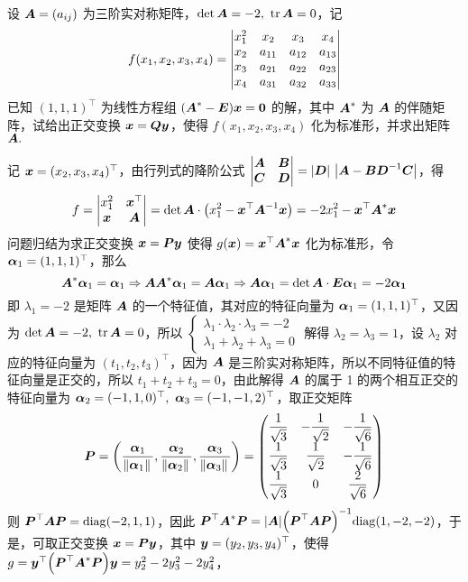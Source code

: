 \begin{example}
    设 $\vb*{A}=(a_{ij})$ 为三阶实对称矩阵，$\det\vb*{A}=-2,~\tr\vb*{A}=0$，记 $$f(x_1,x_2,x_3,x_4)=\mqty|x_1^2&x_2&x_3&x_4\\x_2&a_{11}&a_{12}&a_{13}\\x_3&a_{21}&a_{22}&a_{23}\\x_4&a_{31}&a_{32}&a_{33}|$$
    已知 $(1,1,1)^\top$ 为线性方程组 $\qty(\vb*{A}^*-\vb*{E})\vb*{x}=\vb*{0}$ 的解，其中 $\vb*{A}^*$ 为 $\vb*{A}$ 的伴随矩阵，试给出正交变换 $\vb*{x}=\vb*{Qy}$，使得 $f(x_1,x_2,x_3,x_4)$ 化为标准形，并求出矩阵 $\vb*{A}.$
\end{example}
\begin{solution}
    记 $\vb*{x}=(x_2,x_3,x_4)^\top$，由行列式的降阶公式 $\mqty|\vb*{A}&\vb*{B}\\\vb*{C}&\vb*{D}|=|\vb*{D}|~\qty|\vb*{A}-\vb*{BD}^{-1}\vb*{C}|$，得
    $$f=\mqty|x_1^2&\vb*{x}^\top\\\vb*{x}&\vb*{A}|=\det\vb*{A}\cdot\qty(x_1^2-\vb*{x}^\top\vb*{A}^{-1}\vb*{x})=-2x_1^2-\vb*{x}^\top\vb*{A}^*\vb*{x}$$
    问题归结为求正交变换 $\vb*{x}=\vb*{Py}$ 使得 $g(\vb*{x})=\vb*{x}^\top\vb*{A}^*\vb*{x}$ 化为标准形，令 $\vb*{\alpha}_1=(1,1,1)^\top$，那么
    $$\vb*{A}^*\vb*{\alpha}_1=\vb*{\alpha}_1\Rightarrow \vb*{AA}^*\vb*{\alpha}_1=\vb*{A\alpha}_1\Rightarrow \vb*{A\alpha}_1=\det\vb*{A}\cdot\vb*{E\alpha}_1=-2\vb*{\alpha_1}$$
    即 $\lambda_1=-2$ 是矩阵 $\vb*{A}$ 的一个特征值，其对应的特征向量为 $\vb*{\alpha}_1=(1,1,1)^\top$，又因为 $\det\vb*{A}=-2,~\tr\vb*{A}=0$，所以 $\begin{cases}
            \lambda_1\cdot\lambda_2\cdot\lambda_3=-2 \\
            \lambda_1+\lambda_2+\lambda_3=0
        \end{cases}$ 解得 $\lambda_2=\lambda_3=1$，设 $\lambda_2$ 对应的特征向量为 $(t_1,t_2,t_3)^\top$，因为 $\vb*{A}$ 是三阶实对称矩阵，所以不同特征值的特征向量是正交的，所以 $t_1+t_2+t_3=0$，由此解得 $\vb*{A}$ 的属于 1 的两个相互正交的特征向量为 $\vb*{\alpha}_2=(-1,1,0)^\top,~\vb*{\alpha}_3=(-1,-1,2)^\top$，取正交矩阵
    $$\vb*{P}=\qty(\dfrac{\vb*{\alpha}_1}{\norm*{\vb*{\alpha}_1}},\dfrac{\vb*{\alpha}_2}{\norm*{\vb*{\alpha}_2}},\dfrac{\vb*{\alpha}_3}{\norm*{\vb*{\alpha}_3}})=\mqty(\dfrac{1}{\sqrt{3}}&-\dfrac{1}{\sqrt{2}}&-\dfrac{1}{\sqrt{6}}\\[6pt]\dfrac{1}{\sqrt{3}}&\dfrac{1}{\sqrt{2}}&-\dfrac{1}{\sqrt{6}}\\[6pt]\dfrac{1}{\sqrt{3}}&0&\dfrac{2}{\sqrt{6}})$$
    则 $\vb*{P}^\top\vb*{AP}=\mathrm{diag}(-2,1,1)$，因此 $\vb*{P}^\top\vb*{A}^*\vb*{P}=|\vb*{A}|\qty(\vb*{P}^\top\vb*{AP})^{-1}\mathrm{diag}(1,-2,-2)$，于是，可取正交变换 $\vb*{x}=\vb*{Py}$，其中 $\vb*{y}=(y_2,y_3,y_4)^\top$，使得 $g=\vb*{y}^\top\qty(\vb*{P}^\top\vb*{A}^*\vb*{P})\vb*{y}=y_2^2-2y_3^2-2y_4^2$，

\end{solution}
